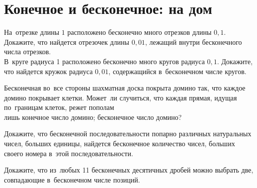 
\section*{Конечное и бесконечное: на дом}




\begin{problems}

\sp
На~отрезке длины $1$ расположено бесконечно много отрезков длины $0{,}1$.
Докажите, что найдется отрезочек длины $0{,}01$, лежащий внутри бесконечного
числа отрезков. 
\\
\sp
В~круге радиуса 1 расположено бесконечно много кругов радиуса $0{,}1$.
Докажите, что найдется кружок радиуса $0{,}01$, содержащийся в~бесконечном
числе кругов.

Бесконечная во~все стороны шахматная доска покрыта домино так, что каждое
домино покрывает клетки.
Может~ли случиться, что каждая прямая, идущая по~границам клеток, режет пополам
\\
\sp
лишь конечное число домино;
\qquad
\sp
бесконечное число домино?

Докажите, что бесконечной последовательности попарно различных натуральных
чисел, больших единицы, найдется бесконечное количество чисел, больших своего
номера в~этой последовательности.

Докажите, что из~любых 11 бесконечных десятичных дробей можно выбрать две,
совпадающие в~бесконечном числе позиций.

\end{problems}

